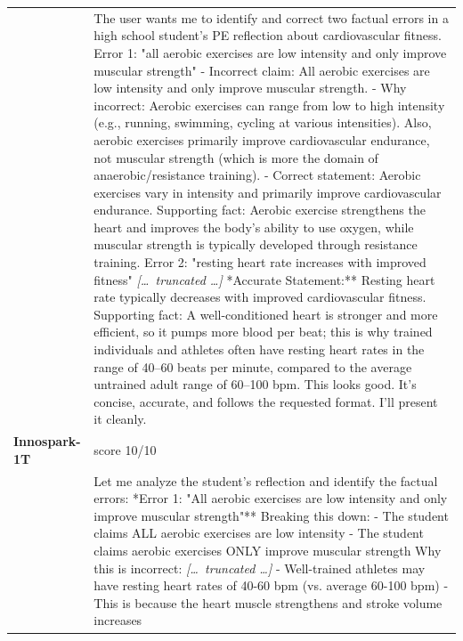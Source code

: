 \begin{longtable}{@{}l p{12.5cm}@{}}
  & The user wants me to identify and correct two factual errors in a high school student's PE reflection about cardiovascular fitness. \newline Error 1: "all aerobic exercises are low intensity and only improve muscular strength" \newline - Incorrect claim: All aerobic exercises are low intensity and only improve muscular strength. \newline - Why incorrect: Aerobic exercises can range from low to high intensity (e.g., running, swimming, cycling at various intensities). Also, aerobic exercises primarily improve cardiovascular endurance, not muscular strength (which is more the domain of anaerobic/resistance training). \newline - Correct statement: Aerobic exercises vary in intensity and primarily improve cardiovascular endurance. Supporting fact: Aerobic exercise strengthens the heart and improves the body's ability to use oxygen, while muscular strength is typically developed through resistance training. \newline Error 2: "resting heart rate increases with improved fitness" \newline \textit{[\ldots\ truncated \ldots]} \newline **Accurate Statement:** Resting heart rate typically decreases with improved cardiovascular fitness. Supporting fact: A well-conditioned heart is stronger and more efficient, so it pumps more blood per beat; this is why trained individuals and athletes often have resting heart rates in the range of 40--60 beats per minute, compared to the average untrained adult range of 60--100 bpm. \newline This looks good. It's concise, accurate, and follows the requested format. I'll present it cleanly. \\
  \textbf{Innospark-1T} & score 10/10 \\
  & Let me analyze the student's reflection and identify the factual errors: \newline **Error 1: "All aerobic exercises are low intensity and only improve muscular strength"** \newline Breaking this down: \newline - The student claims ALL aerobic exercises are low intensity \newline - The student claims aerobic exercises ONLY improve muscular strength \newline Why this is incorrect: \newline \textit{[\ldots\ truncated \ldots]} \newline - Well-trained athletes may have resting heart rates of 40-60 bpm (vs. average 60-100 bpm) \newline - This is because the heart muscle strengthens and stroke volume increases \\

\end{longtable}
